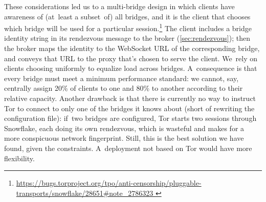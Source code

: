 \documentclass[letterpaper,twocolumn]{article}
\newlength{\urlfootnotesize}
\newcommand{\urlfootnote}[1]{\footnote{
\raggedright\fontsize{\urlfootnotesize}{\urlfootnotesize}\selectfont\url{#1}
}}
\begin{document}
These considerations led us to a multi-bridge design
in which clients have awareness of (at~least a subset~of) all bridges,
and it is the client that chooses which bridge will be used
for a particular session.\urlfootnote{
https://bugs.torproject.org/tpo/anti-censorship/pluggable-transports/snowflake/28651\#note_2786323
}
The client includes a bridge identity string
in its rendezvous message to the broker (\autoref{sec:rendezvous});
then the broker maps the identity to the WebSocket URL
of the corresponding bridge,
and conveys that URL to the proxy
that's chosen to serve the client.
We~rely on clients choosing uniformly
to equalize load across bridges.
A~consequence is that
every bridge must meet a minimum performance standard:
we cannot, say,
centrally assign 20\% of clients to one and 80\% to another
according to their relative capacity.
Another drawback is that there is currently no way to instruct Tor
to connect to only one of the bridges it knows about
(short of rewriting the configuration file):
if~two bridges are configured, Tor starts two sessions through Snowflake,
each doing its own rendezvous,
which is wasteful and makes for a more conspicuous network fingerprint.
Still, this is the best solution we have found, given the constraints.
A~deployment not based on Tor
would have more flexibility.
\end{document}
